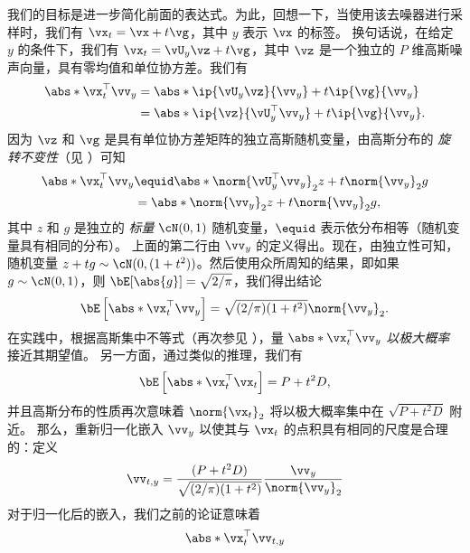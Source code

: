 \documentclass[../../book-main_zh.tex]{subfiles}
\begin{document}
\begin{example}
    我们的目标是进一步简化前面的表达式。为此，回想一下，当使用该去噪器进行采样时，我们有 $\vx_t = \vx + t \vg$，其中 $y$ 表示 $\vx$ 的标签。
    换句话说，在给定 $y$ 的条件下，我们有 $\vx_t = \vU_y \vz + t \vg$，其中 $\vz$ 是一个独立的 $P$ 维高斯噪声向量，具有零均值和单位协方差。我们有
    \begin{align*}
        \abs*{\vx_t^\top \vv_y}
        &=
        \abs*{\ip{\vU_y \vz}{\vv_y} + t \ip{\vg}{\vv_y}}
        \\
        &=
        \abs*{\ip{\vz}{\vU_y^\top \vv_y} + t \ip{\vg}{\vv_y}}.
    \end{align*}
    因为 $\vz$ 和 $\vg$ 是具有单位协方差矩阵的独立高斯随机变量，由高斯分布的 \textit{旋转不变性}（见 \cite{Vershynin2018-br}）可知
    \begin{align*}
        \abs*{\vx_t^\top \vv_y}
        &\equid
        \abs*{\norm{\vU_y^\top \vv_y}_2 z + t\norm{\vv_y}_2 g}
        \\
        &=
        \abs*{\norm{\vv_y}_2 z + t\norm{\vv_y}_2 g},
    \end{align*}
    其中 $z$ 和 $g$ 是独立的 \textit{标量} $\cN(0, 1)$ 随机变量，$\equid$ 表示依分布相等（随机变量具有相同的分布）。
    上面的第二行由 $\vv_y$ 的定义得出。现在，由独立性可知，随机变量 $z + tg \sim \cN(0, (1 + t^2))$。然后使用众所周知的结果，即如果 $g \sim \cN(0, 1)$，则 $\bE[\abs{g}] = \sqrt{2/\pi}$，我们得出结论
    \begin{equation*}
        \bE\left[
            \abs*{\vx_t^\top \vv_y}
        \right]
        =
        \sqrt{(2/\pi) (1 + t^2)} \norm{\vv_y}_2.
    \end{equation*}
    在实践中，根据高斯集中不等式（再次参见 \cite{Vershynin2018-br}），量 $ \abs*{\vx_t^\top \vv_y}$ \textit{以极大概率} 接近其期望值。
    另一方面，通过类似的推理，我们有
    \begin{equation*}
        \bE\left[
            \abs*{\vx_t^\top \vx_t}
        \right]
        =
        P + t^2 D,
    \end{equation*}
    并且高斯分布的性质再次意味着 $\norm{\vx_t}_2$ 将以极大概率集中在 $\sqrt{P + t^2 D}$ 附近。
    那么，重新归一化嵌入 $\vv_y$ 以使其与 $\vx_t$ 的点积具有相同的尺度是合理的：定义
    \begin{equation*}
        \vv_{t, y} = \frac{(P + t^2 D)}{\sqrt{(2/\pi)(1 + t^2)}}
        \frac{\vv_y}{\norm{\vv_y}_2}
    \end{equation*}
    对于归一化后的嵌入，我们之前的论证意味着
    \begin{equation*}
        \abs*{\vx_t^\top \vv_{t,y}}

\end{equation*}
\end{example}
\end{document}
